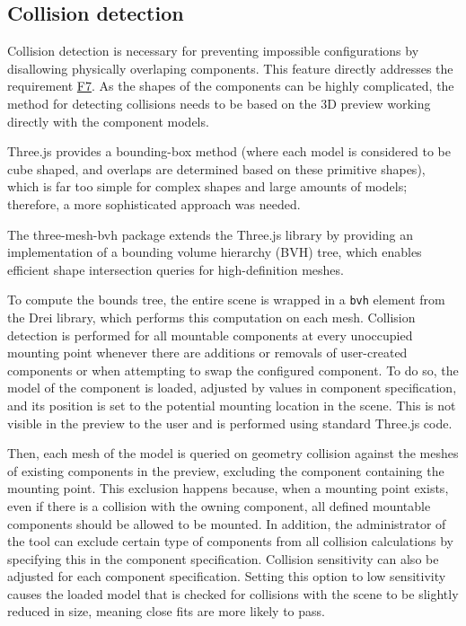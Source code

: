 \subsection{Collision detection}

Collision detection is necessary for preventing impossible configurations by disallowing physically overlaping components. This feature directly addresses the requirement \hyperref[itm:F7]{F7}. As the shapes of the components can be highly complicated, the method for detecting collisions needs to be based on the 3D preview working directly with the component models.

Three.js provides a bounding-box method (where each model is considered to be cube shaped, and overlaps are determined based on these primitive shapes), which is far too simple for complex shapes and large amounts of models; therefore, a more sophisticated approach was needed. 

The three-mesh-bvh package extends the Three.js library by providing an implementation of a bounding volume hierarchy (BVH) tree, which enables efficient shape intersection queries for high-definition meshes. \cite{Johnson2023}

To compute the bounds tree, the entire scene is wrapped in a \texttt{bvh} element from the Drei library, which performs this computation on each mesh. Collision detection is performed for all mountable components at every unoccupied mounting point whenever there are additions or removals of user-created components or when attempting to swap the configured component. To do so, the model of the component is loaded, adjusted by values in component specification, and its position is set to the potential mounting location in the scene. This is not visible in the preview to the user and is performed using standard Three.js code. 

Then, each mesh of the model is queried on geometry collision against the meshes of existing components in the preview, excluding the component containing the mounting point. This exclusion happens because, when a mounting point exists, even if there is a collision with the owning component, all defined mountable components should be allowed to be mounted. In addition, the administrator of the tool can exclude certain type of components from all collision calculations by specifying this in the component specification. Collision sensitivity can also be adjusted for each component specification. Setting this option to low sensitivity causes the loaded model that is checked for collisions with the scene to be slightly reduced in size, meaning close fits are more likely to pass.

